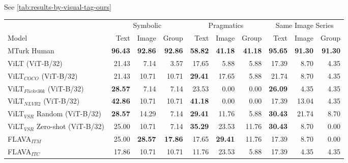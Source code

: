 See \cref{tab:results-by-visual-tag-ours}

\begin{table}[ht]
    \centering
   \begin{adjustbox}{max width=\textwidth}
  \begin{tabular}{l|rrr|rrr|rrr}
    \toprule
     &
      \multicolumn{3}{c|}{Symbolic} &
      \multicolumn{3}{c|}{Pragmatics} &
      \multicolumn{3}{c}{Same Image Series} \\
    Model & Text & Image & Group & Text & Image & Group & Text & Image & Group \\\midrule
 MTurk Human                  & \textbf{96.43} & \textbf{92.86} & \textbf{92.86} & \textbf{58.82} & \textbf{41.18} & \textbf{41.18} & \textbf{95.65} & \textbf{91.30} & \textbf{91.30} \\
 ViLT (ViT-B/32)                     & 21.43          & 7.14           & 3.57           & 17.65          & 5.88           & 5.88           & 17.39          & 8.70           & 4.35           \\
 ViLT$_{COCO}$ (ViT-B/32)            & 21.43          & 10.71          & 10.71          & \textbf{29.41} & 17.65          & 5.88           & 21.74          & 8.70           & 4.35           \\
 ViLT$_{Flickr30k}$ (ViT-B/32)       & \textbf{28.57} & 7.14           & 7.14           & 23.53          & 0.00           & 0.00           & \textbf{26.09} & 4.35           & 4.35           \\
 ViLT$_{NLVR2}$ (ViT-B/32)           & \textbf{42.86} & 10.71          & 10.71          & \textbf{41.18} & 0.00           & 0.00           & 17.39          & 13.04          & 4.35           \\
 ViLT$_{VSR}$ Random (ViT-B/32)      & \textbf{28.57} & 14.29          & 7.14           & \textbf{29.41} & 11.76          & 5.88           & \textbf{30.43} & 21.74          & 8.70           \\
 ViLT$_{VSR}$ Zero-shot (ViT-B/32)   & 25.00          & 10.71          & 7.14           & \textbf{35.29} & 23.53          & 11.76          & \textbf{30.43} & 8.70           & 0.00           \\
 FLAVA$_{ITM}$                       & 25.00          & \textbf{28.57} & \textbf{17.86} & 17.65          & \textbf{29.41} & 11.76          & 17.39          & 8.70           & 0.00           \\
 FLAVA$_{ITC}$                       & 17.86          & 10.71          & 10.71          & 11.76          & 23.53          & 5.88           & 17.39          & 4.35           & 4.35           \\

\end{tabular}
\end{adjustbox}
\end{table}
